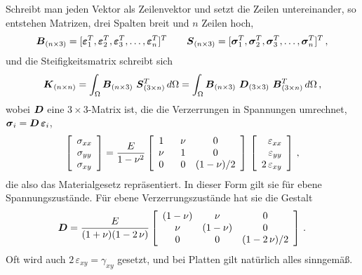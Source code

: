 Schreibt man jeden Vektor als Zeilenvektor und setzt die Zeilen untereinander, so entstehen Matrizen, drei Spalten breit und $n$ Zeilen hoch,
\begin{align}
\vek B_{(n \times 3)} = [\vek \varepsilon_1^T, \vek \varepsilon_2^T, \vek
\varepsilon_3^T, \ldots,\vek \varepsilon_n^T]^T \qquad \vek S_{(n \times 3)} = [\vek
\sigma_1^T, \vek \sigma_2^T, \vek \sigma_3^T, \ldots,\vek \sigma_n^T]^T\,,
\end{align}
und die Steifigkeitsmatrix schreibt sich
\begin{align}
\vek K_{(n \times n)} = \int_{\Omega} \vek B_{(n \times 3)} \,\,\vek S^T_{(3 \times n)}
\,d\Omega = \int_{\Omega} \vek B_{(n \times 3)} \,\, \vek D_{(3 \times 3)}\,\,\vek B_{(3
\times n)}^T \,d\Omega\,,
\end{align}
wobei $\vek D$ eine $3 \times 3$-Matrix ist, die die Verzerrungen in Spannungen
umrechnet, $\vek \sigma_i = \vek D\,\vek \varepsilon_i$,
\begin{align}
\left[ \barr {c} \sigma_{xx} \\ \sigma_{yy} \\ \sigma_{xy} \earr \right] = \frac{E}{1 -
\nu^2} \left [ \barr {c c c} 1\,\, \,\,&\nu & 0 \\ \nu\,\,\,\, & 1 & 0 \\ 0\,\,\,\, & 0
& (1-\nu)/2 \earr \right] \, \left[ \barr {r} \varepsilon_{xx} \\ \varepsilon_{yy} \\
2\,\varepsilon_{xy} \earr \right ]\,,
\end{align}
die also das Materialgesetz repr\"{a}sentiert. In dieser Form gilt sie f\"{u}r ebene Spannungszust\"{a}nde. F\"{u}r ebene Verzerrungszust\"{a}nde  hat sie die Gestalt
\begin{align}
\vek D = \frac{E}{(1 + \nu)(1 - 2\,\nu)} \left [ \barr {c c c} (1 - \nu) &\nu & 0 \\ \nu
& (1 - \nu) & 0 \\ 0 & 0 & (1-2\,\nu)/2 \earr \right] \,.
\end{align}
Oft wird auch $2\,\varepsilon_{xy} = \gamma_{xy}$ gesetzt, und bei Platten gilt nat\"{u}rlich alles sinngem\"{a}{\ss}.


